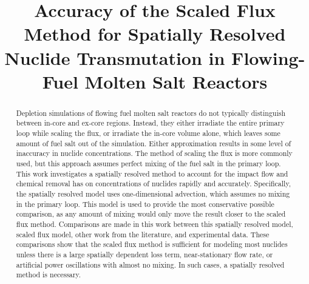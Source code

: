 \documentclass{style/nseJournal}
\begin{document}
\title{Accuracy of the Scaled Flux Method for Spatially Resolved Nuclide Transmutation in Flowing-Fuel Molten Salt Reactors} %

{}

{}



\titlePage

\begin{abstract}
Depletion simulations of flowing fuel molten salt reactors do not typically distinguish between in-core and ex-core regions.
Instead, they either irradiate the entire primary loop while scaling the flux, or irradiate the in-core volume alone, which leaves some amount of fuel salt out of the simulation.
Either approximation results in some level of inaccuracy in nuclide concentrations.
The method of scaling the flux is more commonly used, but this approach assumes perfect mixing of the fuel salt in the primary loop.
This work investigates a spatially resolved method to account for the impact flow and chemical removal has on concentrations of nuclides rapidly and accurately.
Specifically, the spatially resolved model uses one-dimensional advection, which assumes no mixing in the primary loop.
This model is used to provide the most conservative possible comparison, as any amount of mixing would only move the result closer to the scaled flux method.
Comparisons are made in this work between this spatially resolved model, scaled flux model, other work from the literature, and experimental data.
These comparisons show that the scaled flux method is sufficient for modeling most nuclides unless there is a large spatially dependent loss term, near-stationary flow rate, or artificial power oscillations with almost no mixing.
In such cases, a spatially resolved method is necessary.
\end{abstract}
\end{document}
